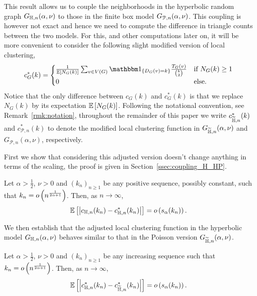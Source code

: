 This result allows us to couple the neighborhoods in the hyperbolic random graph $G_{\mathbb{H},n}(\alpha,\nu)$ to those in the finite box model $G_{{\mathcal P},n}(\alpha,\nu)$. This coupling is however not exact and hence we need to compute the difference in triangle counts between the two models. For this, and other computations later on, it will be more convenient to consider the following slight modified version of local clustering,
\begin{equation}\label{eq:def_local_clustering_ast_general}
	c_{G}^\ast(k) = \begin{cases}
			\frac{1}{\Exp{N_G(k)}} \sum_{v \in V(G)} \ind{D_G(v) = k} \frac{\T_G(v)}{\binom{k}{2}} &\mbox{if } N_G(k) \ge 1\\
			0 &\mbox{else.}
		\end{cases}
\end{equation}
Notice that the only difference between $c_G(k)$ and $c_G^\ast(k)$ is that we replace $N_G(k)$ by its expectation $\mathbb{E}\left[N_G(k)\right]$. Following the notational convention, see Remark~\ref{rmk:notation}, throughout the remainder of this paper we write $c_{\widetilde{\mathbb{H}},n}^\ast(k)$ and $c_{\mathcal{P},n}^\ast(k)$ to denote the modified local clustering function in $G_{\widetilde{\mathbb{H}},n}(\alpha, \nu)$ and $G_{\mathcal{P},n}(\alpha,\nu)$, respectively.

First we show that considering this adjusted version doesn't change anything in terms of the scaling, the proof is given in Section~\ref{ssec:coupling_H_HP}.

\begin{lemma}\label{lem:clustering_ast_H}
Let $\alpha > \frac{1}{2}$, $\nu > 0$ and $(k_n)_{n\ge 1}$ be any positive sequence, possibly constant, such that $k_n = o\left(n^{\frac{1}{2\alpha + 1}}\right)$. Then, as $n \to \infty$,
\[
	\mathbb{E}\left[\left|c_{\mathbb{H},n}(k_n) - c_{\mathbb{H},n}^\ast(k_n)\right|\right] = o\left(s_\alpha(k_n)\right).
\]
\end{lemma}

We then establish that the adjusted local clustering function in the hyperbolic model $G_{\mathbb{H},n}(\alpha,\nu)$ behaves similar to that in the Poisson version $G_{\widetilde{\mathbb{H}}, n}(\alpha,\nu)$.

\begin{proposition}\label{prop:clustering_ast_H_Pois}
Let $\alpha > \frac{1}{2}$, $\nu > 0$ and $(k_n)_{n\ge 1}$ be any increasing sequence such that $k_n = o\left(n^{\frac{1}{2\alpha + 1}}\right)$. Then, as $n \to \infty$,
\[
	\mathbb{E}\left[\left|c_{\mathbb{H},n}^\ast(k_n) - c_{\widetilde{\mathbb{H}},n}^\ast(k_n)\right|\right] = o\left(s_\alpha(k_n)\right).
\]
\end{proposition}

